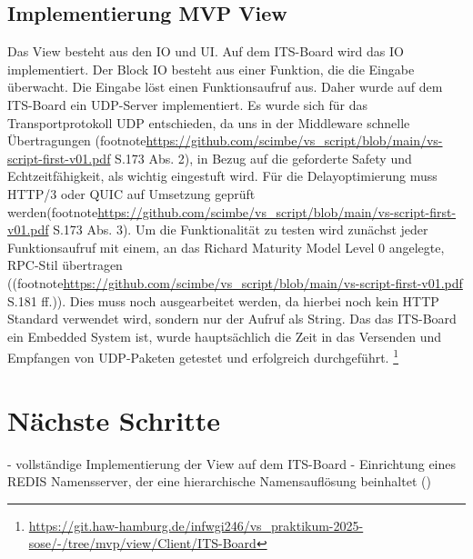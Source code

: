 \documentclass{article}
\begin{document}
\subsection{Implementierung MVP View}
Das View besteht aus den IO und UI. Auf dem ITS-Board wird das IO implementiert. Der Block IO besteht aus einer Funktion, die die Eingabe überwacht. Die Eingabe löst einen Funktionsaufruf aus.
Daher wurde auf dem ITS-Board ein UDP-Server implementiert. Es wurde sich für das Transportprotokoll UDP entschieden, da uns in der Middleware schnelle Übertragungen (footnote{\url{https://github.com/scimbe/vs_script/blob/main/vs-script-first-v01.pdf} S.173 Abs. 2}), in Bezug auf die
geforderte Safety und Echtzeitfähigkeit, als wichtig eingestuft wird. Für die Delayoptimierung muss HTTP/3 oder QUIC auf Umsetzung geprüft werden(footnote{\url{https://github.com/scimbe/vs_script/blob/main/vs-script-first-v01.pdf} S.173 Abs. 3}).
Um die Funktionalität zu testen wird zunächst jeder Funktionsaufruf mit einem, an das Richard Maturity Model Level 0 angelegte, RPC-Stil übertragen ((footnote{\url{https://github.com/scimbe/vs_script/blob/main/vs-script-first-v01.pdf} S.181 ff.})). Dies muss noch ausgearbeitet werden, da hierbei noch kein HTTP Standard verwendet wird, sondern nur der Aufruf als String.
Das das ITS-Board ein Embedded System ist, wurde hauptsächlich die Zeit in das Versenden und Empfangen von UDP-Paketen getestet und erfolgreich durchgeführt.
\footnote{\url{https://git.haw-hamburg.de/infwgi246/vs_praktikum-2025-sose/-/tree/mvp/view/Client/ITS-Board}} 

 
\section{Nächste Schritte}
- vollständige Implementierung der View auf dem ITS-Board
- Einrichtung eines REDIS Namensserver, der eine hierarchische Namensauflösung beinhaltet ()
\end{document}
